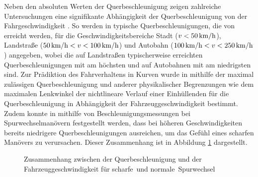 Neben den absoluten Werten der Querbeschleunigung zeigen zahlreiche Untersuchungen eine signifikante Abhängigkeit der Querbeschleunigung von der Fahrgeschwindigkeit \cite{Dragon.2008,Reymond.2001,Schimmelpfennig.1985,Xu.2015}. So werden in \cite{Dragon.2008} typische Querbeschleunigungen, die von  erreicht werden, für die Geschwindigkeitsbereiche Stadt ($v<50\,\mathrm{km/h}$), Landstraße ($50\,\mathrm{km/h}<v<100\,\mathrm{km/h}$) und Autobahn ($100\,\mathrm{km/h}<v<250\,\mathrm{km/h}$) angegeben, wobei die auf Landstraßen typischerweise erreichten Querbeschleunigungen mit  am höchsten und auf Autobahnen mit  am niedrigsten sind. Zur Prädiktion des Fahrverhaltens in Kurven wurde in \cite{Reymond.2001} mithilfe der maximal zulässigen Querbeschleunigung und anderer physikalischer Begrenzungen wie dem maximalen Lenkwinkel der nichtlineare Verlauf einer Einhüllenden für die Querbeschleunigung in Abhängigkeit der Fahrzeuggeschwindigkeit bestimmt.
Zudem konnte in \cite{Schimmelpfennig.1985} mithilfe von Beschleunigungsmessungen bei Spurwechselmanövern festgestellt werden, dass bei höheren Geschwindigkeiten bereits niedrigere Querbeschleunigungen ausreichen, um das Gefühl eines scharfen Manövers zu verursachen. Dieser Zusammenhang ist in Abbildung \ref{fig:ay_v_schimmelpfennig} dargestellt.
\begin{figure}[h]
	\centering
	\fontsize{24pt}{16pt}\selectfont
	\caption{Zusammenhang zwischen der Querbeschleunigung und der Fahrzeuggeschwindigkeit für \glqq scharfe\grqq~und \glqq normale\grqq~Spurwechsel \cite{Schimmelpfennig.1985}}
	\label{fig:ay_v_schimmelpfennig}
\end{figure}

